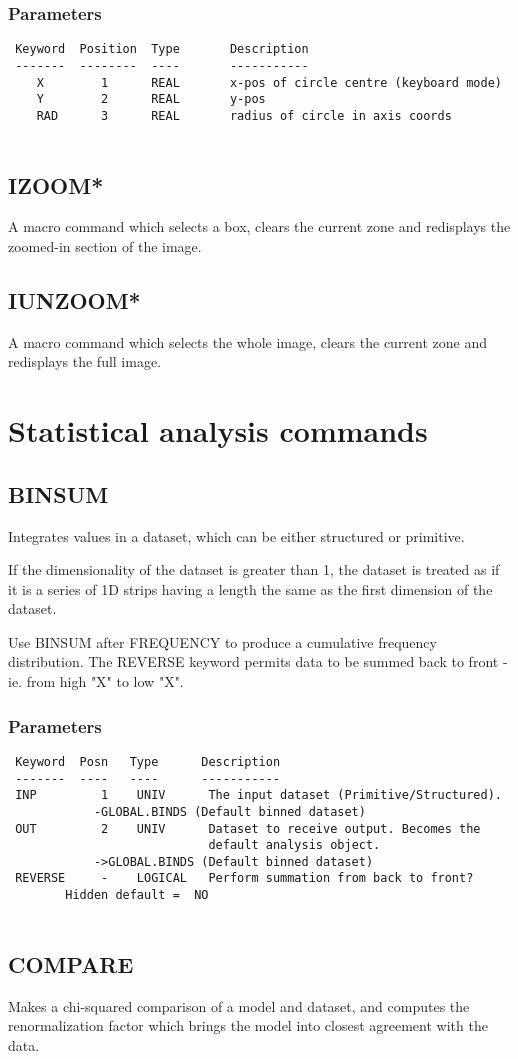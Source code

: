 \documentclass{book}
\renewcommand{\_}{{\tt\char'137}}     %
\begin{document}
\subsection{Parameters}
\begin{verbatim}
 Keyword  Position  Type       Description
 -------  --------  ----       -----------
    X        1      REAL       x-pos of circle centre (keyboard mode)
    Y        2      REAL       y-pos
    RAD      3      REAL       radius of circle in axis coords
 
\end{verbatim}\section{IZOOM*}
A macro command which selects a box, clears the current zone and
redisplays the zoomed-in section of the image.
\section{IUNZOOM*}
A macro command which selects the whole image, clears the current
zone and redisplays the full image.
 
\chapter{Statistical analysis commands}
\section{BINSUM}
Integrates values in a dataset, which can be either structured
or primitive.
 
If the dimensionality of the dataset is greater than 1, the
dataset is treated as if it is a series of 1D strips having
a length the same as the first dimension of the dataset.
 
Use BINSUM after FREQUENCY to produce a cumulative
frequency distribution. The REVERSE keyword permits data to
be summed back to front - ie. from high "X" to low "X".
 
\subsection{Parameters}
\begin{verbatim}
 Keyword  Posn   Type      Description
 -------  ----   ----      -----------
 INP         1    UNIV      The input dataset (Primitive/Structured).
            -GLOBAL.BINDS (Default binned dataset)
 OUT         2    UNIV      Dataset to receive output. Becomes the
                            default analysis object.
            ->GLOBAL.BINDS (Default binned dataset)
 REVERSE     -    LOGICAL   Perform summation from back to front?
        Hidden default =  NO
 
\end{verbatim}\section{COMPARE}
Makes a chi-squared comparison of a model and dataset, and
computes the renormalization factor which brings the model into
closest agreement with the data.
 
\end{document}
